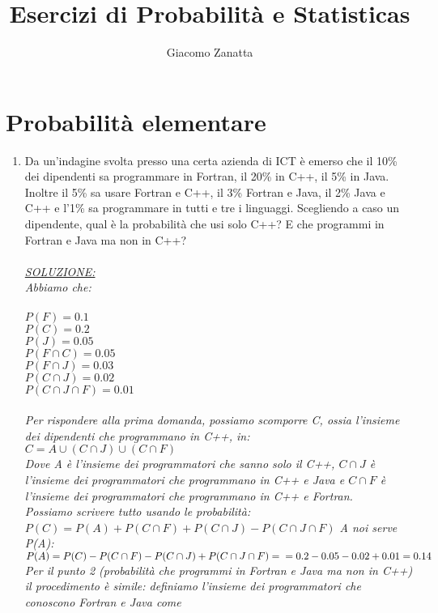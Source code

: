 \documentclass{article}
\title{Esercizi di Probabilità e Statisticas}
\author{Giacomo Zanatta}
\begin{document}
\maketitle
\tableofcontents
\newpage
\section{Probabilità elementare}
\begin{enumerate}
\item Da un’indagine svolta presso una certa azienda di ICT è emerso che il 10\% dei
dipendenti sa programmare in Fortran, il 20\% in C++, il 5\% in Java. Inoltre il
5\% sa usare Fortran e C++, il 3\% Fortran e Java, il 2\% Java e C++ e l’1\% sa
programmare in tutti e tre i linguaggi. Scegliendo a caso un dipendente, qual è la
probabilità che usi solo C++? E che programmi in Fortran e Java ma non in C++? \\ \\
\emph{\underline{SOLUZIONE:}\\
Abbiamo che:\\ \\
$P(F) = 0.1$ \\
$P(C) = 0.2$\\
$P(J) = 0.05$ \\
${P({F}\cap{C})}=0.05$\\
${P({F}\cap{J})}=0.03$\\
${P({C}\cap{J})}=0.02$\\
${P({C}\cap{J}\cap{F})}=0.01$\\ \\
Per rispondere alla prima domanda, possiamo scomporre C, ossia l'insieme dei dipendenti che programmano in C++, in:\\
$C = {A}\cup{({C}\cap{J})}\cup{({C}\cap{F})}  $ \\
Dove A è l'insieme dei programmatori che sanno solo il C++, ${C}\cap{J}$ è l'insieme dei programmatori che programmano in C++ e Java e ${C}\cap{F}$ è l'insieme dei programmatori che programmano in C++ e Fortran.\\
Possiamo scrivere tutto usando le probabilità:\\
$P(C) = P(A)+P({C}\cap{F})+P({C}\cap{J})-P({C}\cap{J}\cap{F})$
A noi serve P(A):\\
$P(A) = P(C)-P({C}\cap{F})-P({C}\cap{J})+P({C}\cap{J}\cap{F}) = \\=0.2-0.05-0.02+0.01=0.14$\\
Per il punto 2 (probabilità che programmi in Fortran e Java ma non in C++) il procedimento è simile: definiamo l'insieme dei programmatori che conoscono Fortran e Java come\\
}
\end{enumerate}
\end{document}
